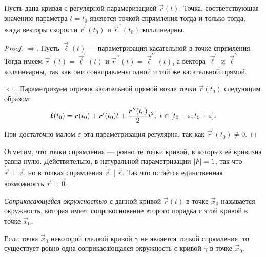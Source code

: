 \begin{proposition} \label{proposition:Inflection}
	Пусть дана кривая с регулярной парамеризацией $\vec{r}(t)$. Точка, соответствующая значению параметра $t = t_0$ является точкой спрямления тогда и только тогда, когда векторы скорости $\vec{r}^\prime(t_0)$ и $\vec{r}^{\prime\prime}(t_0)$ коллинеарны.
\end{proposition}

\begin{proof}
	$\Rightarrow$. Пусть $\vec{\ell}(t)$ --- параметризация касательной в точке спрямления. Тогда имеем $\vec{r}^\prime(t) = \vec{\ell}^\prime(t)$ и $\vec{r}^{\prime\prime}(t) = \vec{\ell}^{\prime\prime}(t)$, а вектора $\vec{\ell}^\prime$ и $\vec{\ell}^{\prime\prime}$ коллинеарны, так как они сонаправлены одной и той же касательной прямой.

	$\Leftarrow$. Параметризуем отрезок касательной прямой возле точки $\vec{r}(t_0)$ следующим образом:
	\[
		\boldsymbol{\ell}(t_0) = \boldsymbol{r}(t_0) + \boldsymbol{r}^\prime(t_0)t + \frac{\boldsymbol{r}^{\prime\prime}(t_0)}{2}t^2,\ t \in [t_0 - \varepsilon; t_0 + \varepsilon].
	\]
	При достаточно малом $\varepsilon$ эта параметризация регулярна, так как $\vec{r}^{\prime}(t_0) \ne 0$.
\end{proof}

Отметим, что точки спрямления --- ровно те точки кривой, в которых её кривизна равна нулю. Действительно, в натуральной параметризации $\left\lvert\dot{\boldsymbol{r}}\right\rvert = 1$, так что $\dot{\vec{r}} \perp \ddot{\vec{r}}$, но в точках спрямления $\dot{\vec{r}} \parallel \ddot{\vec{r}}$. Так что остаётся единственная возможность $\ddot{\vec{r}} = \vec{0}$.

\begin{definition}
	\textit{Соприкасающейся окружностью} с данной кривой $\vec{r}(t)$ в точке $\vec{x}_0$ называется окружность, которая имеет соприкосновение второго порядка с этой кривой в точке $\vec{x}_0$.
\end{definition}

\begin{theorem} \label{theorem:TouchingCircle}
	Если точка $\vec{x}_0$ некоторой гладкой кривой $\gamma$ не является точкой спрямления, то существует ровно одна соприкасающаяся окружность с кривой $\gamma$ в точке $\vec{x}_0$.
\end{theorem}

